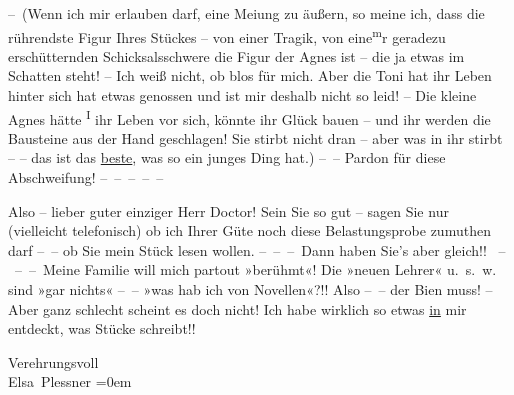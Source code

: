 \pstart
           {\pb}– (Wenn ich mir erlauben darf, eine Meiung zu äußern, so meine ich,
               dass die rührendste Figur Ihres Stückes – von einer Tragik, von eine\substVorne{}\textsuperscript{m}\substDazwischen{}r\substHinten{} geradezu erschütternden Schicksalsschwere die Figur der Agnes ist – die ja
               etwas im Schatten steht! – Ich weiß nicht, ob blos für mich. Aber die Toni hat ihr
               Leben hinter sich hat etwas genossen und ist mir deshalb nicht so leid! – Die kleine
               Agnes hätte \substVorne{}\textsuperscript{I }\substDazwischen{}i\substHinten{}hr Leben vor sich, könnte ihr Glück bauen – und ihr werden die Bausteine aus
               der Hand geschlagen! Sie stirbt nicht dran – aber was in ihr stirbt – – das ist das
                  \uline{beste}, was so ein junges Ding hat.) – –
               Pardon für {\pb}diese Abschweifung! – – – – –\pend
           
\pstart
           Also – lieber guter einziger Herr Doctor! Sein Sie so gut – sagen Sie nur \label{K_L03720-1v}\label{K_L03720-1} (vielleicht telefonisch) ob ich Ihrer Güte noch diese Belastungsprobe
               zumuthen darf – – ob Sie mein Stück lesen wollen. – – – Dann haben Sie's aber gleich!! 
               – – – Meine Familie will
               mich partout »berühmt«! Die »neuen Lehrer«
               u. s. w. sind »gar nichts« – – »was hab ich von Novellen«?!! Also
               – – der Bien muss! – Aber ganz schlecht scheint es doch nicht! Ich habe wirklich
               so etwas \uline{in} mir entdeckt, was Stücke schreibt!!\pend
           
\pstart
           Verehrungsvoll{\\[\baselineskip]}\spacefill\mbox{Elsa Plessner}\pend
           \leftskip=0em{}\endnumbering{}
\begin{anhang}
\end{anhang}
      